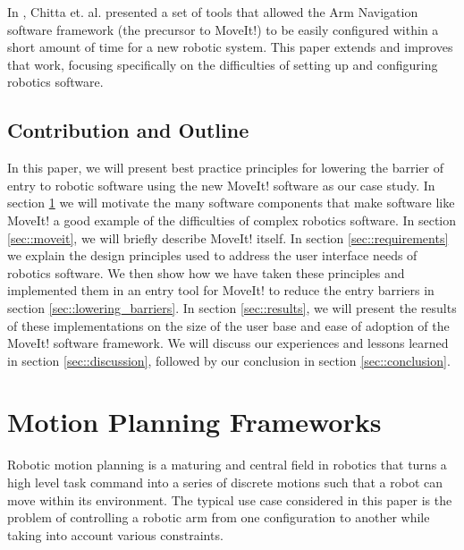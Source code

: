 \documentclass[10pt,journal,compsoc]{joser1}
\begin{document}
{In \cite{chitta2012perception}, Chitta et. al. presented a set of tools that allowed the Arm Navigation software framework (the precursor to MoveIt!) to be easily configured within a short amount of time for a new robotic system. This paper extends and improves that work, focusing specifically on the difficulties of setting up and configuring robotics software.

\subsection{Contribution and Outline}

In this paper, we will present best practice principles for lowering the barrier of entry to robotic software using the new MoveIt! software \cite{moveit} as our case study. In section \ref{sec::motion_planning} we will motivate the many software components that make software like MoveIt! a good example of the difficulties of complex robotics software. In section \ref{sec::moveit}, we will briefly describe MoveIt! itself. In section \ref{sec::requirements} we explain the design principles used to address the user interface needs of robotics software. We then show how we have taken these principles and implemented them in an entry tool for MoveIt! to reduce the entry barriers in section \ref{sec::lowering_barriers}. In section \ref{sec::results}, we will present the results of these implementations on the size of the user base and ease of adoption of the MoveIt! software framework. We will discuss our experiences and lessons learned in section \ref{sec::discussion}, followed by our conclusion in section \ref{sec::conclusion}.

\section{Motion Planning Frameworks}
\label{sec::motion_planning}

Robotic motion planning is a maturing and central field in robotics \cite{moll2011teaching} that turns a high level task command into a series of discrete motions such that a robot can move within its environment. The typical use case considered in this paper is the problem of controlling a robotic arm from one configuration to another while taking into account various constraints.

}
\end{document}
